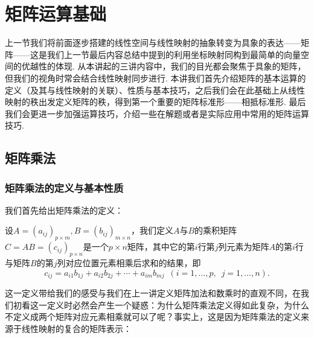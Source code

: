 \chapter{矩阵运算基础}

上一节我们将前面逐步搭建的线性空间与线性映射的抽象转变为具象的表达——矩阵——这是我们上一节最后内容总结中提到的利用坐标映射同构到最简单的向量空间的优越性的体现. 从本讲起的三讲内容中，我们的目光都会聚焦于具象的矩阵，但我们的视角时常会结合线性映射同步进行. 本讲我们首先介绍矩阵的基本运算的定义（及其与线性映射的关联）、性质与基本技巧，之后我们会在此基础上从线性映射的秩出发定义矩阵的秩，得到第一个重要的矩阵标准形——相抵标准形. 最后我们会更进一步加强运算技巧，介绍一些在解题或者是实际应用中常用的矩阵运算技巧.

\section{矩阵乘法}

\subsection{矩阵乘法的定义与基本性质}

我们首先给出矩阵乘法的定义：
\begin{definition}{}{}
    设$A=(a_{ij})_{p\times m},B=(b_{ij})_{m\times n}$，我们定义$A$与$B$的乘积矩阵$C=AB=(c_{ij})_{p\times n}$是一个$p\times n$矩阵，其中它的第$i$行第$j$列元素为矩阵$A$的第$i$行与矩阵$B$的第$j$列对应位置元素相乘后求和的结果，即
    \[c_{ij}=a_{i1}b_{1j}+a_{i2}b_{2j}+\cdots+a_{im}b_{mj}\enspace(i=1,\ldots,p,\enspace j=1,\ldots,n).\]
\end{definition}

这一定义带给我们的感受与我们在上一讲定义矩阵加法和数乘时的直观不同，在我们初看这一定义时必然会产生一个疑惑：为什么矩阵乘法定义得如此复杂，为什么不定义成两个矩阵对应元素相乘就可以了呢？事实上，这是因为矩阵乘法的定义来源于线性映射的复合的矩阵表示：

